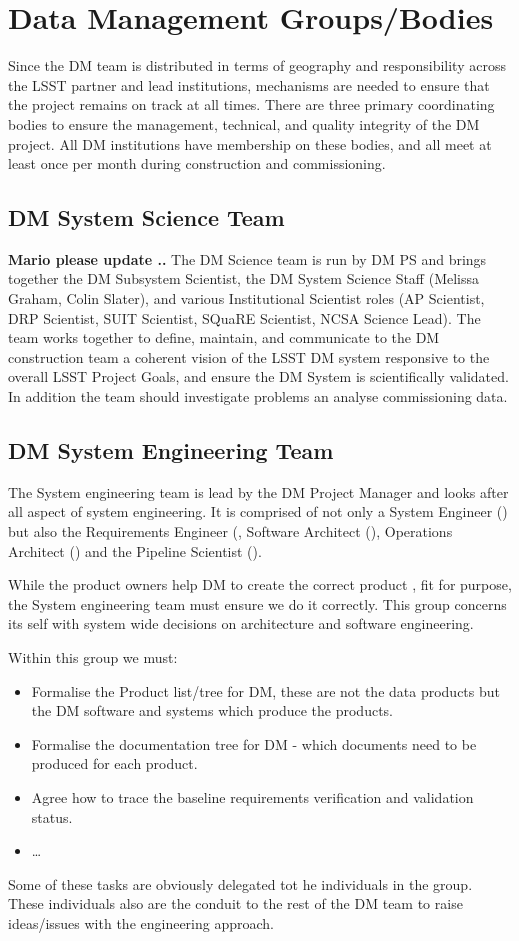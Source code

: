 \section{Data Management Groups/Bodies} \label{sect:groups}
Since the DM team is distributed in terms of geography and responsibility across the LSST partner and lead institutions, mechanisms are needed to ensure that the project remains on track at all times.  There are three primary coordinating bodies to ensure the management, technical, and quality integrity of the DM project.  All DM institutions have membership on these bodies, and all meet at least once per month during construction and commissioning.

\subsection{DM System Science Team}
{\bf Mario  please update ..}
The DM Science team is run by DM PS and brings together the DM Subsystem Scientist, the DM System Science Staff (Melissa Graham, Colin Slater), and various Institutional Scientist roles (AP Scientist, DRP Scientist, SUIT Scientist, SQuaRE Scientist, NCSA Science Lead). 
The team works together to define, maintain, and communicate to the DM construction team a coherent vision of the LSST DM system responsive to the overall LSST Project Goals, and ensure the DM System is scientifically validated. In addition the team should  investigate problems an analyse commissioning data. 

\subsection{DM System Engineering Team \label{sect:sysengt}}
The System engineering team is lead by the DM Project Manager and looks after all aspect of system engineering. It is comprised of not only a System Engineer () but also the Requirements Engineer (, Software Architect (), Operations Architect () and the Pipeline Scientist ().

While the product owners help DM to create the correct product , fit for purpose, the System engineering team must ensure we do it correctly. This group concerns its self with system wide decisions on architecture and software engineering.  

Within this  group we must:
\begin{itemize}
\item Formalise the Product list/tree for DM, these are not the data products but the DM software and systems which produce the products. 
\item Formalise the documentation tree for DM - which documents need to be produced for each product. 
\item Agree how to trace the baseline requirements verification and validation status.
\item  \ldots
\end{itemize}
 Some of these tasks are obviously delegated tot he individuals in the group. These individuals also are the conduit to the rest of the DM team to raise ideas/issues with the engineering approach. 

